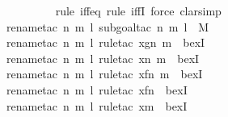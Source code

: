 \begin{isabellebody}
\ \ \ \ \ \ \ \ \isamarkupfalse%
{\isacharparenleft}{\kern0pt}rule\ iff{\isacharunderscore}{\kern0pt}eq{\isacharcomma}{\kern0pt}\ rule\ iffI{\isacharcomma}{\kern0pt}\ force{\isacharcomma}{\kern0pt}\ clarsimp{\isacharparenright}{\kern0pt}\isanewline
\ \ \ \ \ \ \ \ \isamarkupfalse%
{\isacharparenleft}{\kern0pt}rename{\isacharunderscore}{\kern0pt}tac\ n\ m\ l{\isacharcomma}{\kern0pt}\ subgoal{\isacharunderscore}{\kern0pt}tac\ {\isachardoublequoteopen}{\isacharless}{\kern0pt}{\isacharless}{\kern0pt}n{\isacharcomma}{\kern0pt}\ m{\isachargreater}{\kern0pt}{\isacharcomma}{\kern0pt}\ l{\isachargreater}{\kern0pt}\ {\isasymin}\ M{\isachardoublequoteclose}{\isacharparenright}{\kern0pt}\isanewline
\ \ \ \ \ \ \ \ \ \isamarkupfalse%
{\isacharparenleft}{\kern0pt}rename{\isacharunderscore}{\kern0pt}tac\ n\ m\ l{\isacharcomma}{\kern0pt}\ rule{\isacharunderscore}{\kern0pt}tac\ x{\isacharequal}{\kern0pt}{\isachardoublequoteopen}g{\isacharbackquote}{\kern0pt}{\isacharless}{\kern0pt}n{\isacharcomma}{\kern0pt}\ m{\isachargreater}{\kern0pt}{\isachardoublequoteclose}\ \ bexI{\isacharparenright}{\kern0pt}\isanewline
\ \ \ \ \ \ \ \ \ \ \isamarkupfalse%
{\isacharparenleft}{\kern0pt}rename{\isacharunderscore}{\kern0pt}tac\ n\ m\ l{\isacharcomma}{\kern0pt}\ rule{\isacharunderscore}{\kern0pt}tac\ x{\isacharequal}{\kern0pt}{\isachardoublequoteopen}{\isacharless}{\kern0pt}n{\isacharcomma}{\kern0pt}\ m{\isachargreater}{\kern0pt}{\isachardoublequoteclose}\ \ bexI{\isacharparenright}{\kern0pt}\isanewline
\ \ \ \ \ \ \ \ \ \ \ \isamarkupfalse%
{\isacharparenleft}{\kern0pt}rename{\isacharunderscore}{\kern0pt}tac\ n\ m\ l{\isacharcomma}{\kern0pt}\ rule{\isacharunderscore}{\kern0pt}tac\ x{\isacharequal}{\kern0pt}{\isachardoublequoteopen}{\isacharless}{\kern0pt}f{\isacharbackquote}{\kern0pt}n{\isacharcomma}{\kern0pt}\ m{\isachargreater}{\kern0pt}{\isachardoublequoteclose}\ \ bexI{\isacharparenright}{\kern0pt}\ \ \isanewline
\ \ \ \ \ \ \ \ \ \ \ \ \isamarkupfalse%
{\isacharparenleft}{\kern0pt}rename{\isacharunderscore}{\kern0pt}tac\ n\ m\ l{\isacharcomma}{\kern0pt}\ rule{\isacharunderscore}{\kern0pt}tac\ x{\isacharequal}{\kern0pt}{\isachardoublequoteopen}f{\isacharbackquote}{\kern0pt}n{\isachardoublequoteclose}\ \ bexI{\isacharparenright}{\kern0pt}\isanewline
\ \ \ \ \ \ \ \ \ \ \ \ \ \isamarkupfalse%
{\isacharparenleft}{\kern0pt}rename{\isacharunderscore}{\kern0pt}tac\ n\ m\ l{\isacharcomma}{\kern0pt}\ rule{\isacharunderscore}{\kern0pt}tac\ x{\isacharequal}{\kern0pt}{\isachardoublequoteopen}m{\isachardoublequoteclose}\ \ bexI{\isacharparenright}{\kern0pt}\isanewline

\end{isabellebody}

